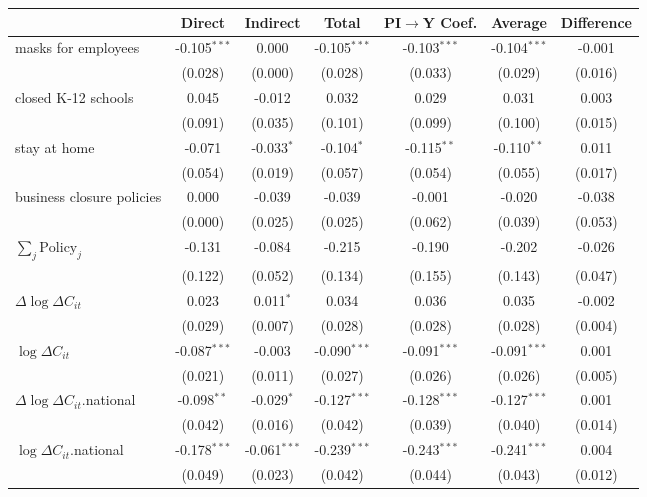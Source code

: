 
\begin{tabular}{lccccc|>{}c}
\toprule
  & Direct & Indirect & Total & PI$\to$Y Coef. & Average & Difference\\
\midrule
masks for employees & -0.105$^{***}$ & 0.000 & -0.105$^{***}$ & -0.103$^{***}$ & -0.104$^{***}$ & -0.001\\
 & (0.028) & (0.000) & (0.028) & (0.033) & (0.029) & (0.016)\\
closed K-12 schools & 0.045 & -0.012 & 0.032 & 0.029 & 0.031 & 0.003\\
 & (0.091) & (0.035) & (0.101) & (0.099) & (0.100) & (0.015)\\
stay at home & -0.071 & -0.033$^{*}$ & -0.104$^{*}$ & -0.115$^{**}$ & -0.110$^{**}$ & 0.011\\
 & (0.054) & (0.019) & (0.057) & (0.054) & (0.055) & (0.017)\\
business closure policies & 0.000 & -0.039 & -0.039 & -0.001 & -0.020 & -0.038\\
 & (0.000) & (0.025) & (0.025) & (0.062) & (0.039) & (0.053)\\
$\sum_j \mathrm{Policy}_j$ & -0.131 & -0.084 & -0.215 & -0.190 & -0.202 & -0.026\\
 & (0.122) & (0.052) & (0.134) & (0.155) & (0.143) & (0.047)\\
$\Delta \log \Delta C_{it}$ & 0.023 & 0.011$^{*}$ & 0.034 & 0.036 & 0.035 & -0.002\\
 & (0.029) & (0.007) & (0.028) & (0.028) & (0.028) & (0.004)\\
$\log \Delta C_{it}$ & -0.087$^{***}$ & -0.003 & -0.090$^{***}$ & -0.091$^{***}$ & -0.091$^{***}$ & 0.001\\
 & (0.021) & (0.011) & (0.027) & (0.026) & (0.026) & (0.005)\\
$\Delta \log \Delta C_{it}$.national & -0.098$^{**}$ & -0.029$^{*}$ & -0.127$^{***}$ & -0.128$^{***}$ & -0.127$^{***}$ & 0.001\\
 & (0.042) & (0.016) & (0.042) & (0.039) & (0.040) & (0.014)\\
$\log \Delta C_{it}$.national & -0.178$^{***}$ & -0.061$^{***}$ & -0.239$^{***}$ & -0.243$^{***}$ & -0.241$^{***}$ & 0.004\\
 & (0.049) & (0.023) & (0.042) & (0.044) & (0.043) & (0.012)\\
\bottomrule
\end{tabular}